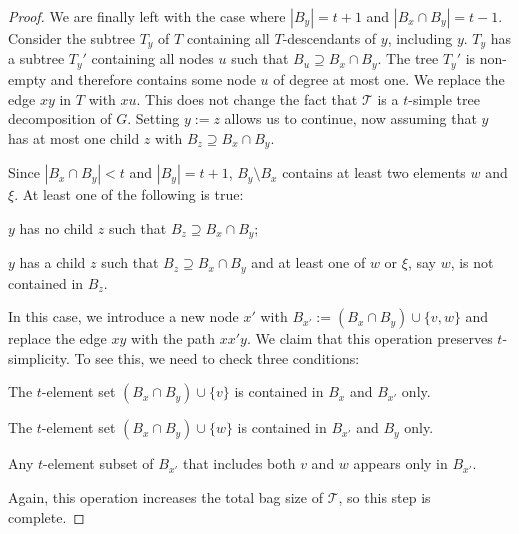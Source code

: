 \documentclass[kpfonts]{patmorin}
\theoremstyle{named}
\begin{document}
\begin{proof}
    We are finally left with the case where $|B_y|=t+1$ and $|B_x\cap B_y|= t-1$.  Consider the subtree $T_y$ of $T$ containing all $T$-descendants of $y$, including $y$.  $T_y$ has a subtree $T_y'$ containing all nodes $u$ such that $B_u\supseteq B_x\cap B_y$.  The tree $T_y'$ is non-empty and therefore contains some node $u$ of degree at most one.  We replace the edge $xy$ in $T$ with $xu$.  This does not change the fact that $\mathcal{T}$ is a $t$-simple tree decomposition of $G$.  Setting $y:=z$ allows us to continue, now assuming that $y$ has at most one child $z$ with $B_z\supseteq B_x\cap B_y$.

    Since $|B_x\cap B_y|<t$ and $|B_y|=t+1$, $B_y\setminus B_x$ contains at least two elements $w$ and $\xi$.  At least one of the following is true:
    \begin{inparaenum}[(i)]
        \item $y$ has no child $z$ such that $B_z\supseteq B_x\cap B_y$;
        \item $y$ has a child $z$ such that $B_z\supseteq B_x\cap B_y$ and at least one of $w$ or $\xi$, say $w$, is not contained in $B_z$.
    \end{inparaenum}
    In this case, we introduce a new node $x'$ with $B_{x'}:=(B_x\cap B_y)\cup\{v,w\}$ and replace the edge $xy$ with the path $xx'y$.  We claim that this operation preserves $t$-simplicity.  To see this, we need to check three conditions:
    \begin{compactenum}
        \item The $t$-element set $(B_x\cap B_y)\cup\{v\}$ is contained in $B_x$ and $B_{x'}$ only.
        \item The $t$-element set $(B_x\cap B_y)\cup\{w\}$ is contained in $B_{x'}$ and $B_y$ only.
        \item Any $t$-element subset of $B_{x'}$ that includes both $v$ and $w$ appears only in $B_{x'}$.
    \end{compactenum}
    Again, this operation increases the total bag size of $\mathcal{T}$, so this step is complete.

\end{proof}
\end{document}
